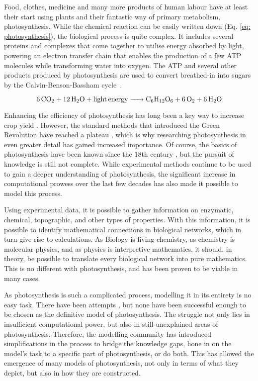 \documentclass[11pt]{article}
\begin{document}


\newpage
\setcounter{page}{1}

\noindent
Food, clothes, medicine and many more products of human labour have at least their start using plants and their fantastic way of primary metabolism, photosynthesis. While the chemical reaction can be easily written down (Eq. \ref{eq: photosynthesis}), the biological process is quite complex. It includes several proteins and complexes that come together to utilise energy absorbed by light, powering an electron transfer chain that enables the production of a few ATP molecules while transforming water into oxygen. The ATP and several other products produced by photosynthesis are used to convert breathed-in  into sugars by the Calvin-Benson-Bassham cycle~\parencite{stirbet_photosynthesis_2020}.

\begin{equation}
    \label{eq: photosynthesis}
    \ce{6CO2 + 12H2O + light energy -> C6H12O6 + 6O2 + 6H2O}
\end{equation}

Enhancing the efficiency of photosynthesis has long been a key way to increase crop yield \parencite{murchie_agriculture_2009}. However, the standard methods that introduced the Green Revolution have reached a plateau \parencite{long_can_2006}, which is why researching photosynthesis in even greater detail has gained increased importance. Of course, the basics of photosynthesis have been known since the 18th century \parencite{ingenhousz_experiments_1779}, but the pursuit of knowledge is still not complete. While experimental methods continue to be used to gain a deeper understanding of photosynthesis, the significant increase in computational prowess over the last few decades has also made it possible to model this process.

Using experimental data, it is possible to gather information on enzymatic, chemical, topographic, and other types of properties. With this information, it is possible to identify mathematical connections in biological networks, which in turn give rise to calculations. As Biology is living chemistry, as chemistry is molecular physics, and as physics is interpretive mathematics, it should, in theory, be possible to translate every biological network into pure mathematics. This is no different with photosynthesis, and has been proven to be viable in many cases.

As photosynthesis is such a complicated process, modelling it in its entirety is no easy task. There have been attempts \parencite{zhu_ephotosynthesis_2013}, but none have been successful enough to be chosen as the definitive model of photosynthesis. The struggle not only lies in insufficient computational power, but also in still-unexplained areas of photosynthesis. Therefore, the modelling community has introduced simplifications in the process to bridge the knowledge gaps, hone in on the model's task to a specific part of photosynthesis, or do both. This has allowed the emergence of many models of photosynthesis, not only in terms of what they depict, but also in how they are constructed.
\end{document}
